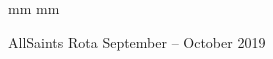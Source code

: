 \documentclass[10pt]{article}
\begin{document}
\ifx\pdfoutput\undefined
\else
{} mm %
 mm
\fi
\begingroup
\ifpdf
\else
{}
\fi
\endgroup
\thispagestyle{empty}
\begin{center}
{\Large 
  AllSaints Rota 
September -- October 2019
}%
\vspace{0.5em}


\end{center}
\end{document}

